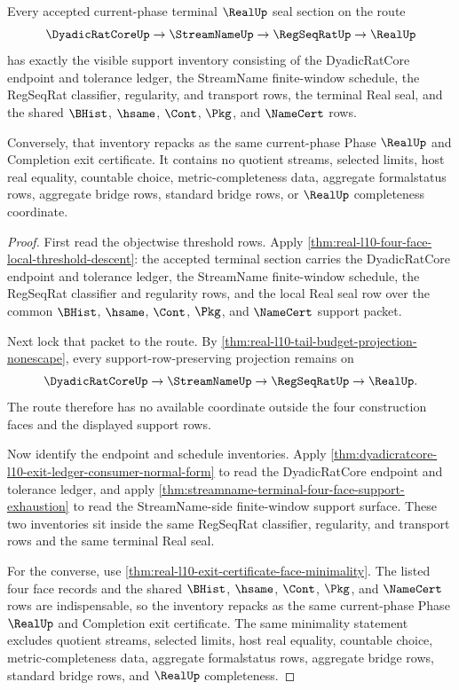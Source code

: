 \begin{theorem}
\label{thm:real-l10-four-face-support-exhaustion}
Every accepted current-phase terminal $\RealUp$ seal section on the route
$$
\DyadicRatCoreUp \to \StreamNameUp \to \RegSeqRatUp \to \RealUp
$$
has exactly the visible support inventory consisting of the DyadicRatCore endpoint and tolerance ledger, the StreamName finite-window schedule, the RegSeqRat classifier, regularity, and transport rows, the terminal Real seal, and the shared $\BHist$, $\hsame$, $\Cont$, $\Pkg$, and $\NameCert$ rows.

Conversely, that inventory repacks as the same current-phase Phase $\RealUp$ and Completion exit certificate. It contains no quotient streams, selected limits, host real equality, countable choice, metric-completeness data, aggregate formalstatus rows, aggregate bridge rows, standard bridge rows, or $\RealUp$ completeness coordinate.
\end{theorem}
\begin{proof}
First read the objectwise threshold rows. Apply \autoref{thm:real-l10-four-face-local-threshold-descent}: the accepted terminal section carries the DyadicRatCore endpoint and tolerance ledger, the StreamName finite-window schedule, the RegSeqRat classifier and regularity rows, and the local Real seal row over the common $\BHist$, $\hsame$, $\Cont$, $\Pkg$, and $\NameCert$ support packet.

Next lock that packet to the route. By \autoref{thm:real-l10-tail-budget-projection-nonescape}, every support-row-preserving projection remains on
$$
\DyadicRatCoreUp \to \StreamNameUp \to \RegSeqRatUp \to \RealUp .
$$
The route therefore has no available coordinate outside the four construction faces and the displayed support rows.

Now identify the endpoint and schedule inventories. Apply \autoref{thm:dyadicratcore-l10-exit-ledger-consumer-normal-form} to read the DyadicRatCore endpoint and tolerance ledger, and apply \autoref{thm:streamname-terminal-four-face-support-exhaustion} to read the StreamName-side finite-window support surface. These two inventories sit inside the same RegSeqRat classifier, regularity, and transport rows and the same terminal Real seal.

For the converse, use \autoref{thm:real-l10-exit-certificate-face-minimality}. The listed four face records and the shared $\BHist$, $\hsame$, $\Cont$, $\Pkg$, and $\NameCert$ rows are indispensable, so the inventory repacks as the same current-phase Phase $\RealUp$ and Completion exit certificate. The same minimality statement excludes quotient streams, selected limits, host real equality, countable choice, metric-completeness data, aggregate formalstatus rows, aggregate bridge rows, standard bridge rows, and $\RealUp$ completeness.
\end{proof}

